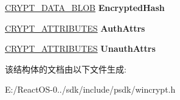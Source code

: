 \begin{DoxyCompactItemize}
\hyperlink{struct___c_r_y_p_t_o_a_p_i___b_l_o_b}{C\+R\+Y\+P\+T\+\_\+\+D\+A\+T\+A\+\_\+\+B\+L\+OB} {\bfseries Encrypted\+Hash}
\item 
\mbox{\label{struct___c_m_s_g___s_i_g_n_e_r___i_n_f_o_a47d240b1142b76c53d9b333e598e349b}} 
\hyperlink{struct___c_r_y_p_t___a_t_t_r_i_b_u_t_e_s}{C\+R\+Y\+P\+T\+\_\+\+A\+T\+T\+R\+I\+B\+U\+T\+ES} {\bfseries Auth\+Attrs}
\item 
\mbox{\label{struct___c_m_s_g___s_i_g_n_e_r___i_n_f_o_a7ac4fcc0b525a1ed308c803d31bbaf19}} 
\hyperlink{struct___c_r_y_p_t___a_t_t_r_i_b_u_t_e_s}{C\+R\+Y\+P\+T\+\_\+\+A\+T\+T\+R\+I\+B\+U\+T\+ES} {\bfseries Unauth\+Attrs}
\end{DoxyCompactItemize}


该结构体的文档由以下文件生成\+:\begin{DoxyCompactItemize}
\item 
E\+:/\+React\+O\+S-\/0../sdk/include/psdk/wincrypt.\+h\end{DoxyCompactItemize}
